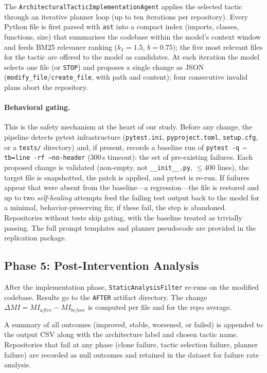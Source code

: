 \documentclass[runningheads]{llncs}
\begin{document}
The \texttt{ArchitecturalTacticImplementationAgent} applies the selected tactic through an iterative planner loop (up to ten iterations per repository). Every Python file is first parsed with \texttt{ast} into a compact index (imports, classes, functions, size) that summarises the codebase within the model's context window and feeds BM25 relevance ranking ($k_1{=}1.5$, $b{=}0.75$); the five most relevant files for the tactic are offered to the model as candidates. At each iteration the model selects one file (or \texttt{STOP}) and proposes a single change as JSON (\texttt{modify\_file}/\texttt{create\_file}, with path and content); four consecutive invalid plans abort the repository.

\paragraph{Behavioral gating.}
This is the safety mechanism at the heart of our study. Before any change, the pipeline detects pytest infrastructure (\texttt{pytest.ini}, \texttt{pyproject.toml}, \texttt{setup.cfg}, or a \texttt{tests/} directory) and, if present, records a baseline run of \texttt{pytest -q --tb=line -rf --no-header} (300\,s timeout): the set of pre-existing failures. Each proposed change is validated (non-empty, not \texttt{\_\_init\_\_.py}, $\leq$400 lines), the target file is snapshotted, the patch is applied, and pytest is re-run. If failures appear that were absent from the baseline---a regression---the file is restored and up to two \emph{self-healing} attempts feed the failing test output back to the model for a minimal, behavior-preserving fix; if these fail, the step is abandoned. Repositories without tests skip gating, with the baseline treated as trivially passing. The full prompt templates and planner pseudocode are provided in the replication package.

\subsection{Phase 5: Post-Intervention Analysis}

After the implementation phase, \texttt{StaticAnalysisFilter} re-runs on the modified codebase. Results go to the \texttt{AFTER} artifact directory. The change $\Delta MI = MI_{after} - MI_{before}$ is computed per file and for the repo average.

A summary of all outcomes (improved, stable, worsened, or failed) is appended to the output CSV along with the architecture label and chosen tactic name. Repositories that fail at any phase (clone failure, tactic selection failure, planner failure) are recorded as null outcomes and retained in the dataset for failure rate analysis.
\end{document}
